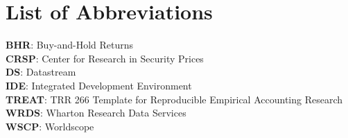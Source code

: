 \clearpage
{}
\section*{List of Abbreviations}
\setlength{\parindent}{0em}
\setcounter{page}{4}

\textbf{BHR}: Buy-and-Hold Returns \\
\textbf{CRSP}: Center for Research in Security Prices \\
\textbf{DS}: Datastream \\
\textbf{IDE}: Integrated Development Environment \\
\textbf{TREAT}: TRR 266 Template for Reproducible Empirical Accounting Research \\
\textbf{WRDS}: Wharton Research Data Services \\
\textbf{WSCP}: Worldscope

\setlength{\parindent}{4em}
\clearpage